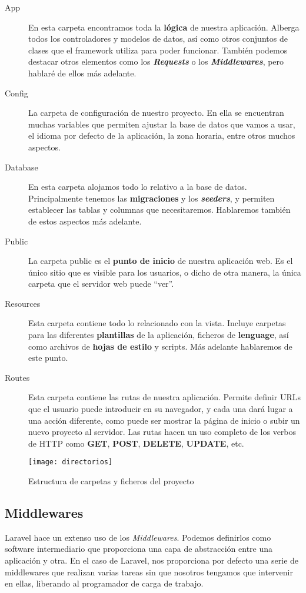 \begin{description}
    \item [App] En esta carpeta encontramos toda la \textbf{lógica} de nuestra aplicación. Alberga todos los controladores y modelos de datos, así como otros conjuntos de clases que el framework utiliza para poder funcionar. También podemos destacar otros elementos como los \textbf{\textit{Requests}} o los \textbf{\textit{Middlewares}}, pero hablaré de ellos más adelante.
    \item [Config] La carpeta de configuración de nuestro proyecto. En ella se encuentran muchas variables que permiten ajustar la base de datos que vamos a usar, el idioma por defecto de la aplicación, la zona horaria, entre otros muchos aspectos.
    \item [Database] En esta carpeta alojamos todo lo relativo a la base de datos. Principalmente tenemos las \textbf{migraciones} y los \textbf{\textit{seeders}}, y permiten establecer las tablas y columnas que necesitaremos. Hablaremos también de estos aspectos más adelante.
    \item [Public] La carpeta public es el \textbf{punto de inicio} de nuestra aplicación web. Es el único sitio que es visible para los usuarios, o dicho de otra manera, la única carpeta que el servidor web puede ``ver''.
    \item [Resources] Esta carpeta contiene todo lo relacionado con la vista. Incluye carpetas para las diferentes \textbf{plantillas} de la aplicación, ficheros de \textbf{lenguage}, así como archivos de \textbf{hojas de estilo} y scripts. Más adelante hablaremos de este punto.
    \item [Routes] Esta carpeta contiene las rutas de nuestra aplicación. Permite definir URLs que el usuario puede introducir en su navegador, y cada una dará lugar a una acción diferente, como puede ser mostrar la página de inicio o subir un nuevo proyecto al servidor. Las rutas hacen un uso completo de los verbos de HTTP como \textbf{GET}, \textbf{POST}, \textbf{DELETE}, \textbf{UPDATE}, etc.
\end{description}

\begin{figure}
    \centering
    \texttt{[image: directorios]}
    \caption{Estructura de carpetas y ficheros del proyecto}
    \label{directorios}
\end{figure}

\subsection{Middlewares}
Laravel hace un extenso uso de los \textit{Middlewares}. Podemos definirlos como software intermediario que proporciona una capa de abstracción entre una aplicación y otra. En el caso de Laravel, nos proporciona por defecto una serie de middlewares que realizan varias tareas sin que nosotros tengamos que intervenir en ellas, liberando al programador de carga de trabajo.\\

